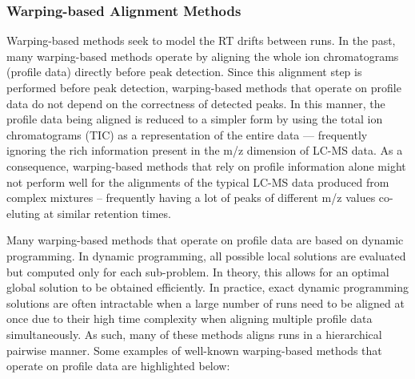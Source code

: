 \subsubsection{Warping-based Alignment Methods}

Warping-based methods seek to model the RT drifts between runs. In the past, many warping-based methods operate by aligning the whole ion chromatograms (profile data) directly before peak detection. Since this alignment step is performed before peak detection, warping-based methods that operate on profile data do not depend on the correctness of detected peaks. In this manner, the profile data being aligned is reduced to a simpler form by using the total ion chromatograms (TIC) as a representation of the entire data --- frequently ignoring the rich information present in the m/z dimension of LC-MS data. As a consequence, warping-based methods that rely on profile information alone might not perform well for the alignments of the typical LC-MS data produced from complex mixtures -- frequently having a lot of peaks of different m/z values co-eluting at similar retention times. 

Many warping-based methods that operate on profile data are based on dynamic programming. In dynamic programming, all possible local solutions are evaluated but computed only for each sub-problem. In theory, this allows for an optimal global solution to be obtained efficiently. In practice, exact dynamic programming solutions are often intractable when a large number of runs need to be aligned at once due to their high time complexity when aligning multiple profile data simultaneously. As such, many of these methods aligns runs in a hierarchical pairwise manner. Some examples of well-known warping-based methods that operate on profile data are highlighted below: 

